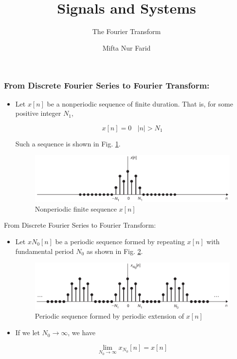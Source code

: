 \documentclass[pdflatex,compress,mathserif]{beamer}
\title{Signals and Systems}
\subtitle{The Fourier Transform}
\author{Mifta Nur Farid}
\begin{document}
\maketitle

\begin{frame}
	\frametitle{From Discrete Fourier Series to Fourier Transform:}
	\begin{itemize}
		\item Let $ x[n] $ be a nonperiodic sequence of finite duration. That is, for some positive integer $ N_1 $,
	
		\begin{equation*}
			x[n] = 0~~~~|n|>N_1
		\end{equation*}
	
		Such a sequence is shown in Fig. \ref{fig:img01}.
		
		\begin{figure}
			\centering
			\includegraphics[width=\linewidth]{img/img01}
			\caption{Nonperiodic finite sequence $ x[n] $}
			\label{fig:img01}
		\end{figure}
		
	\end{itemize}
\end{frame}

\begin{frame}{From Discrete Fourier Series to Fourier Transform:}
	\begin{itemize}
		\item Let $ x{N_0}[n] $ be a periodic sequence formed by repeating $ x[n] $ with fundamental period $ N_0 $ as shown in Fig. \ref{fig:img02}.
		
		\begin{figure}
			\centering
			\includegraphics[width=\linewidth]{img/img02}
			\caption{Periodic sequence formed by periodic extension of $ x[n] $}
			\label{fig:img02}
		\end{figure}
	
		\item If we let $ N_0 \rightarrow \infty$, we have
		
		\begin{equation}\label{eq:01}
			\lim_{N_0 \rightarrow \infty} x_{N_0}[n] = x[n]
		\end{equation}
	
	\end{itemize}
\end{frame}
\end{document}
